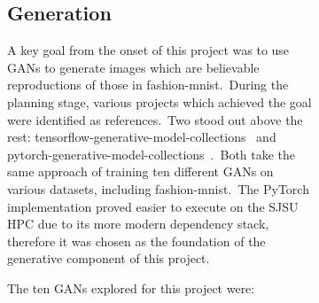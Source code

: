 \documentclass[conference]{IEEEtran}
\begin{document}
\begin{figure}[!h]
\begin{figure}[!h]
    \subsection{Generation}\label{subsec:implementation-generation}

    A key goal from the onset of this project was to use GANs to generate images which are believable reproductions of those in fashion-mnist.\ During the planning stage, various projects which achieved the goal were identified as references.\ Two stood out above the rest: tensorflow-generative-model-collections~\cite{tensorflow-generative-model-collections} and pytorch-generative-model-collections~\cite{original-pytorch-generative-model-collections}.\ Both take the same approach of training ten different GANs on various datasets, including fashion-mnist.\ The PyTorch implementation proved easier to execute on the SJSU HPC due to its more modern dependency stack, therefore it was chosen as the foundation of the generative component of this project.

    The ten GANs explored for this project were:


\end{figure}
\end{figure}
\end{document}
